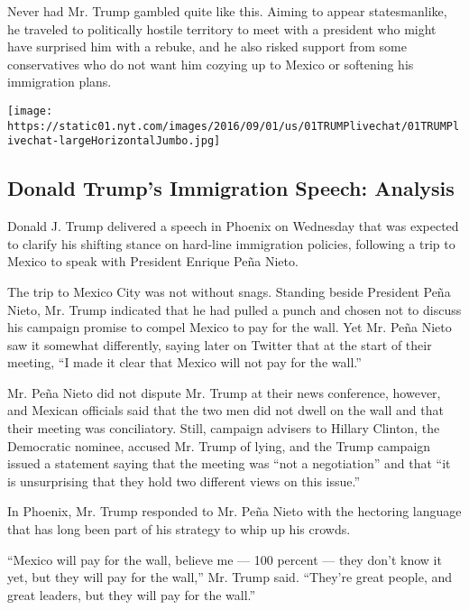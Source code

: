 Never had Mr. Trump gambled quite like this. Aiming to appear
statesmanlike, he traveled to politically hostile territory to meet with
a president who might have surprised him with a rebuke, and he also
risked support from some conservatives who do not want him cozying up to
Mexico or softening his immigration plans.

\href{https://www.nytimes.com/interactive/2016/08/31/us/politics/trump-immigration-speech-live.html}{}

\texttt{[image: https://static01.nyt.com/images/2016/09/01/us/01TRUMPlivechat/01TRUMPlivechat-largeHorizontalJumbo.jpg]}

\hypertarget{donald-trumps-immigration-speech-analysis}{%
\subsection{Donald Trump's Immigration Speech:
Analysis}\label{donald-trumps-immigration-speech-analysis}}

Donald J. Trump delivered a speech in Phoenix on Wednesday that was
expected to clarify his shifting stance on hard-line immigration
policies, following a trip to Mexico to speak with President Enrique
Peña Nieto.

The trip to Mexico City was not without snags. Standing beside President
Peña Nieto, Mr. Trump indicated that he had pulled a punch and chosen
not to discuss his campaign promise to compel Mexico to pay for the
wall. Yet Mr. Peña Nieto saw it somewhat differently, saying later on
Twitter that at the start of their meeting, ``I made it clear that
Mexico will not pay for the wall.''

Mr. Peña Nieto did not dispute Mr. Trump at their news conference,
however, and Mexican officials said that the two men did not dwell on
the wall and that their meeting was conciliatory. Still, campaign
advisers to Hillary Clinton, the Democratic nominee, accused Mr. Trump
of lying, and the Trump campaign issued a statement saying that the
meeting was ``not a negotiation'' and that ``it is unsurprising that
they hold two different views on this issue.''

In Phoenix, Mr. Trump responded to Mr. Peña Nieto with the hectoring
language that has long been part of his strategy to whip up his crowds.

``Mexico will pay for the wall, believe me --- 100 percent --- they
don't know it yet, but they will pay for the wall,'' Mr. Trump said.
``They're great people, and great leaders, but they will pay for the
wall.''

